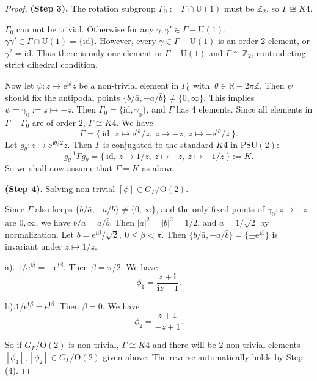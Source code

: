 \documentclass[pdflatex,sn-mathphys]{sn-jnl}%
\numberwithin{equation}{section}
\theoremstyle{thmstyleone}%
\newcommand{\RR}{\mathbb{R}}
\newcommand{\ZZ}{\mathbb{Z}}
\newcommand{\ii}{\mathbf{i}}
\newcommand{\abs}[1]{\left\lvert #1 \right\rvert}
\newcommand{\PSUtwo}{\mathrm{PSU}(2)}
\newcommand{\Uone}{\mathrm{U}(1)}
\newcommand{\Otwo}{\mathrm{O}(2)}
\begin{document}
\begin{proof}
\medskip
\textbf{(Step 3).} The rotation subgroup $\Gamma_0:=\Gamma\cap \Uone$ must be $\ZZ_2$, so $\Gamma\cong K4$.

$\Gamma_0$ can not be trivial. Otherwise for any $\gamma, \gamma'\in \Gamma-\Uone$, $\gamma\gamma'\in \Gamma\cap\Uone=\{\mathrm{id}\}$. However, every $\gamma\in \Gamma-\Uone$ is an order-2 element, or $\gamma^2=\mathrm{id}$. Thus there is only one element in $\Gamma-\Uone$ and $\Gamma\cong\ZZ_2$, contradicting strict dihedral condition.

Now let $\psi:z\mapsto \mathrm{e}^{\ii\theta}z$ be a non-trivial element in $\Gamma_0$ with $\ \theta\in\RR-2\pi\ZZ $. Then $\psi$ should fix the antipodal points $\{b/\bar{a}, -a/\bar{b}\} \neq\{0,\infty\}$. This implies $\psi=\gamma_0:=z\mapsto -z$. Then $\Gamma_0=\{\mathrm{id},\gamma_0\}$, and $\Gamma$ has 4 elements. Since all elements in $\Gamma-\Gamma_0$ are of order 2, $\Gamma\cong K4$. We have
$$ \Gamma=\{\ \mathrm{id},\ z\mapsto \mathrm{e}^{\ii\theta}/z,\ z\mapsto -z,\ z\mapsto -\mathrm{e}^{\ii\theta}/z\ \}. $$
Let $g_\theta:z\mapsto \mathrm{e}^{\ii\theta/2}z$. Then $\Gamma$ is conjugated to the standard $K4$ in $\PSUtwo$:
$$ g_\theta^{-1}\Gamma g_\theta = \{\ \mathrm{id},\ z\mapsto 1/z,\ z\mapsto -z,\ z\mapsto -1/z\ \} := K. $$
So we shall now assume that $\Gamma=K$ as above.

\medskip
\textbf{(Step 4).} Solving non-trivial $[\phi]\in G_\Gamma/\Otwo$.

Since $\Gamma$ also keeps $\{b/\bar{a}, -a/\bar{b}\} \neq\{0,\infty\}$, and the only fixed points of $\gamma_0:z\mapsto -z$ are $0,\infty$, we have $b/\bar{a}=a/\bar{b}$. Then $\abs{a}^2=\abs{b}^2=1/2$, and $a=1/\sqrt{2}$ by normalization. Let $b=\mathrm{e}^{\ii\beta}/\sqrt{2},\ 0\leqslant \beta < \pi$. Then $\{b/\bar{a}, -a/\bar{b}\}=\{ \pm \mathrm{e}^{\ii\beta} \}$ is invariant under $z\mapsto 1/z$.

a). $1/\mathrm{e}^{\ii\beta} = -\mathrm{e}^{\ii\beta}$. Then $\beta=\pi/2$. We have
$$ \phi_1 = \frac{z+\ii}{\ii z +1}. $$

b).$1/\mathrm{e}^{\ii\beta} = \mathrm{e}^{\ii\beta}$. Then $\beta=0$. We have
$$ \phi_2 = \frac{z+1}{-z+1}. $$

So if $G_\Gamma/\Otwo$ is non-trivial, $\Gamma\cong K4$ and there will be 2 non-trivial elements $[\phi_1], [\phi_2]\in G_\Gamma/\Otwo$ given above. The reverse automatically holds by Step (4).
\end{proof}
\end{document}

